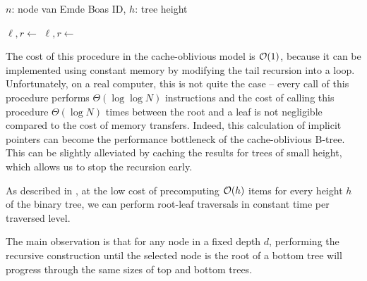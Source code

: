 \begin{algorithmic}
 {$n$: node van Emde Boas ID, $h$: tree height}
	  \EndIf

	 
	 

		\State $\ell, r \gets$ 
			\State {}
		\Else{}
			\State {}
		\EndIf
	\Else
		\State $\ell,r\gets$ 
			\State {}
		\Else
			 
			\State {}
		\EndIf
	\EndIf
\EndFunction
\end{algorithmic}

The cost of this procedure in the cache-oblivious model is $\mathcal{O}(1)$, because
it can be implemented using constant memory by modifying the tail recursion into
a loop. Unfortunately, on a real computer, this is not quite the case --
every call of this procedure performs $\Theta(\log\log N)$ instructions and
the cost of calling this procedure $\Theta(\log N)$ times between the root
and a leaf is not negligible compared to the cost of memory transfers.
Indeed, this calculation of implicit pointers can become the performance
bottleneck of the cache-oblivious B-tree.
This can be slightly alleviated by caching the results for trees of small
height, which allows us to stop the recursion early.

As described in \cite{brodal01}, at the low cost of precomputing $\mathcal{O}(h)$
items for every height $h$ of the binary tree, we can perform root-leaf
traversals in constant time per traversed level.

The main observation is that for any node in a fixed depth $d$,
performing the recursive construction until the selected node is the root
of a bottom tree will progress through the same sizes of top and bottom trees.

